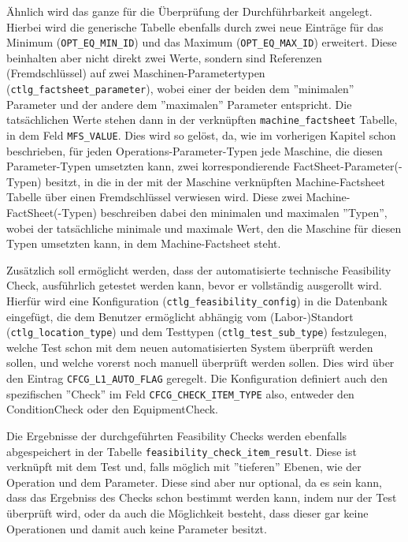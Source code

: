 Ähnlich wird das ganze für die Überprüfung der Durchführbarkeit angelegt. Hierbei wird die generische Tabelle ebenfalls durch zwei neue Einträge für das Minimum (\texttt{OPT\_EQ\_MIN\_ID}) und das Maximum (\texttt{OPT\_EQ\_MAX\_ID}) erweitert. Diese beinhalten aber nicht direkt zwei Werte, sondern sind Referenzen (Fremdschlüssel) auf zwei Maschinen-Parametertypen (\texttt{ctlg\_factsheet\_parameter}), wobei einer der beiden dem ''minimalen'' Parameter und der andere dem ''maximalen'' Parameter entspricht. Die tatsächlichen Werte stehen dann in der verknüpften \texttt{machine\_factsheet} Tabelle, in dem Feld \texttt{MFS\_VALUE}. Dies wird so gelöst, da, wie im vorherigen Kapitel schon beschrieben, für jeden Operations-Parameter-Typen jede Maschine, die diesen Parameter-Typen umsetzten kann, zwei korrespondierende FactSheet-Parameter(-Typen) besitzt, in die in der mit der Maschine verknüpften Machine-Factsheet Tabelle über einen Fremdschlüssel verwiesen wird. Diese zwei Machine-FactSheet(-Typen) beschreiben dabei den minimalen und maximalen ''Typen'', wobei der tatsächliche minimale und maximale Wert, den die Maschine für diesen Typen umsetzten kann, in dem Machine-Factsheet steht.

Zusätzlich soll ermöglicht werden, dass der automatisierte technische Feasibility Check, ausführlich getestet werden kann, bevor er vollständig ausgerollt wird. Hierfür wird eine Konfiguration (\texttt{ctlg\_feasibility\_config}) in die Datenbank eingefügt, die dem Benutzer ermöglicht abhängig vom (Labor-)Standort (\texttt{ctlg\_location\_type}) und dem Testtypen (\texttt{ctlg\_test\_sub\_type}) festzulegen, welche Test schon mit dem neuen automatisierten System überprüft werden sollen, und welche vorerst noch manuell überprüft werden sollen. Dies wird über den Eintrag \texttt{CFCG\_L1\_AUTO\_FLAG} geregelt.
Die Konfiguration definiert auch den spezifischen ''Check'' im Feld \texttt{CFCG\_CHECK\_ITEM\_TYPE} also, entweder den \gls{ConditionCheck} oder den \gls{EquipmentCheck}.

Die Ergebnisse der durchgeführten Feasibility Checks werden ebenfalls abgespeichert in der Tabelle \texttt{feasibility\_check\_item\_result}. Diese ist verknüpft mit dem Test und, falls möglich mit ''tieferen'' Ebenen, wie der Operation und dem Parameter. Diese sind aber nur optional, da es sein kann, dass das Ergebniss des Checks schon bestimmt werden kann, indem nur der Test überprüft wird, oder da auch die Möglichkeit besteht, dass dieser gar keine Operationen und damit auch keine Parameter besitzt.

